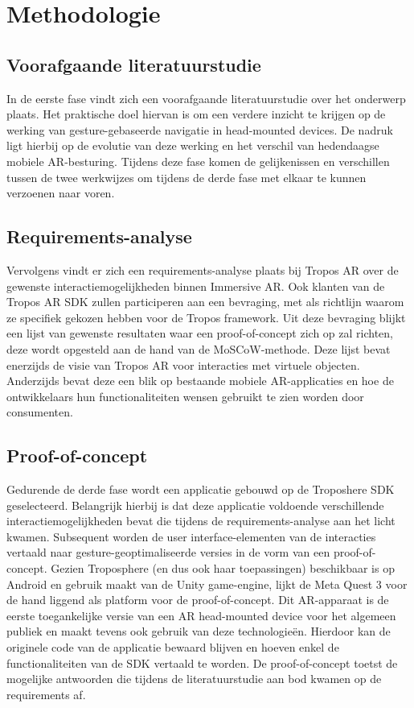 \section{Methodologie}%
\label{sec:methodologie}
\subsection{Voorafgaande literatuurstudie}
\label{subsec:literature-study}
In de eerste fase vindt zich een voorafgaande literatuurstudie over het onderwerp plaats. %
Het praktische doel hiervan is om een verdere inzicht te krijgen op de werking van gesture-gebaseerde navigatie in head-mounted devices.
De nadruk ligt hierbij op de evolutie van deze werking en het verschil van hedendaagse mobiele AR-besturing.
Tijdens deze fase komen de gelijkenissen en verschillen tussen de twee werkwijzes om tijdens de derde fase met elkaar te kunnen verzoenen naar voren.

\subsection{Requirements-analyse}
\label{subsec:requirements-analysis}
Vervolgens vindt er zich een requirements-analyse plaats bij Tropos AR over de gewenste interactiemogelijkheden binnen Immersive AR. %
Ook klanten van de Tropos AR SDK zullen participeren aan een bevraging, met als richtlijn waarom ze specifiek gekozen hebben voor de Tropos framework.
Uit deze bevraging blijkt een lijst van gewenste resultaten waar een proof-of-concept zich op zal richten, deze wordt opgesteld aan de hand van de MoSCoW-methode.
Deze lijst bevat enerzijds de visie van Tropos AR voor interacties met virtuele objecten.
Anderzijds bevat deze een blik op bestaande mobiele AR-applicaties en hoe de ontwikkelaars hun functionaliteiten wensen gebruikt te zien worden door consumenten.

\subsection{Proof-of-concept}
\label{subsec:poc}
Gedurende de derde fase wordt een applicatie gebouwd op de Troposhere SDK geselecteerd. %
Belangrijk hierbij is dat deze applicatie voldoende verschillende interactiemogelijkheden bevat die tijdens de requirements-analyse aan het licht kwamen.
Subsequent worden de user interface-elementen van de interacties vertaald naar gesture-geoptimaliseerde versies in de vorm van een proof-of-concept.
Gezien Troposphere (en dus ook haar toepassingen) beschikbaar is op Android en gebruik maakt van de Unity game-engine, lijkt de Meta Quest 3 voor de hand liggend als platform voor de proof-of-concept.
Dit AR-apparaat is de eerste toegankelijke versie van een AR head-mounted device voor het algemeen publiek en maakt tevens ook gebruik van deze technologie\"en.
Hierdoor kan de originele code van de applicatie bewaard blijven en hoeven enkel de functionaliteiten van de SDK vertaald te worden.
De proof-of-concept toetst de mogelijke antwoorden die tijdens de literatuurstudie aan bod kwamen op de requirements af.

